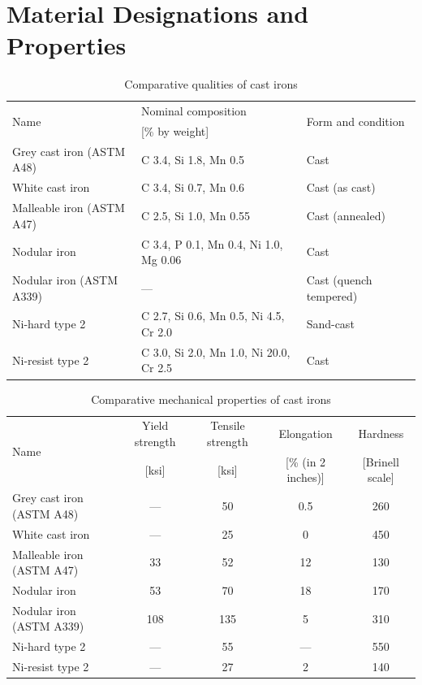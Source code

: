 \documentclass[
10pt,
a4paper,
openany,
svgnames,
]{book}
\begin{document}
\begin{table}
\end{table}

\chapter{Material Designations and Properties} \label{chap: material des and props}

\begin{table}[H]
  \centering
  \caption[Comparative qualities of cast irons]{Comparative qualities of cast irons \cite*{plisga2017standard}}
  \begin{tabular}{lll}
    \toprule
    \multirow{2}{2cm}{Name} & Nominal composition & \multirow{2}{3.5cm}{Form and condition} \\
                            & {[}\% by weight{]} & \\
    \midrule
    Grey cast iron (ASTM A48) & C 3.4, Si 1.8, Mn 0.5                  & Cast \\
    White cast iron           & C 3.4, Si 0.7, Mn 0.6                  & Cast (as cast) \\
    Malleable iron (ASTM A47) & C 2.5, Si 1.0, Mn 0.55                 & Cast (annealed) \\
    Nodular iron              & C 3.4, P 0.1, Mn 0.4, Ni 1.0, Mg 0.06  & Cast \\
    Nodular iron (ASTM A339)  & —                                      & Cast (quench tempered) \\
    Ni-hard type 2            & C 2.7, Si 0.6, Mn 0.5, Ni 4.5, Cr 2.0  & Sand-cast \\
    Ni-resist type 2          & C 3.0, Si 2.0, Mn 1.0, Ni 20.0, Cr 2.5 & Cast \\
    \bottomrule
  \end{tabular}
  \label{tab: cast iron quals}
\end{table}

\begin{table}[H]
  \centering
  \caption[Comparative mechanical properties of cast irons]{Comparative mechanical properties of cast irons \cite{plisga2017standard}}
  \begin{tabular}{lcccc}
    \toprule
    \multirow{2}{2cm}{Name} & Yield strength & Tensile strength & Elongation & Hardness \\
                            & {[}ksi{]} & {[}ksi{]} & {[}\% (in 2 inches){]} & {[}Brinell scale{]} \\
    \midrule
    Grey cast iron (ASTM A48) & — & 50 & 0.5 & 260 \\
    White cast iron & — & 25 & 0 & 450 \\
    Malleable iron (ASTM A47) & 33 & 52 & 12 & 130 \\
    Nodular iron & 53 & 70 & 18 & 170 \\
    Nodular iron (ASTM A339) & 108 & 135 & 5 & 310 \\
    Ni-hard type 2 & — & 55 & — & 550 \\
    Ni-resist type 2 & — & 27 & 2 & 140 \\
    \bottomrule
  \end{tabular}
  \label{tab: cast iron props}
\end{table}
\end{document}
